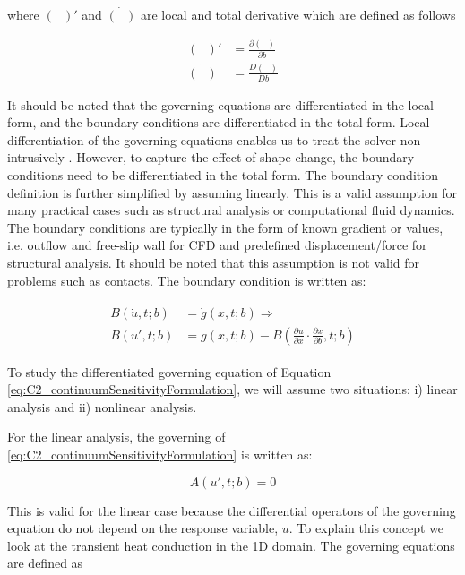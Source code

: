where $(\text{ })'$ and $\dot{(\text{ })}$ are local and total derivative which are defined as follows

\begin{subequations}
\begin{align*}
    (\text{ })' &= \frac{\partial (\text{ })}{\partial b} \\
    \dot{(\text{ })} &= \frac{D (\text{ })}{D b}
\end{align*}
\end{subequations}

It should be noted that the governing equations are differentiated in the local form, and the boundary conditions are differentiated in the total form. Local differentiation of the governing equations enables us to treat the solver non-intrusively \cite{cross2014local}. However, to capture the effect of shape change, the boundary conditions need to be differentiated in the total form. The boundary condition definition is further simplified by assuming linearly. This is a valid assumption for many practical cases such as structural analysis or computational fluid dynamics. The boundary conditions are typically in the form of known gradient or values, i.e. outflow and free-slip wall for CFD and predefined displacement/force for structural analysis. It should be noted that this assumption is not valid for problems such as contacts. The boundary condition is written as:

\begin{align}\label{eq:C2_linearSAboundaryCondtions}
\begin{split}
    B(\dot{u}, t; b) &= \dot{g}(x, t; b) \Rightarrow \\
    B(u', t; b) &= \dot{g}(x, t; b) - B(\frac{\partial u}{\partial x} \cdot \frac{\partial x}{\partial b}, t; b)
\end{split}
\end{align}

To study the differentiated governing equation of Equation \eqref{eq:C2_continuumSensitivityFormulation}, we will assume two situations: i) linear analysis and ii) nonlinear analysis.

For the linear analysis, the governing  of \eqref{eq:C2_continuumSensitivityFormulation} is written as:

\begin{equation}\label{eq:C2_linearSAgoverningEquation}
    A(u', t; b) = 0 
\end{equation}

This is valid for the linear case because the differential operators of the governing equation do not depend on the response variable, $u$. To explain this concept we look at the transient heat conduction in the 1D domain. The governing equations are defined as

